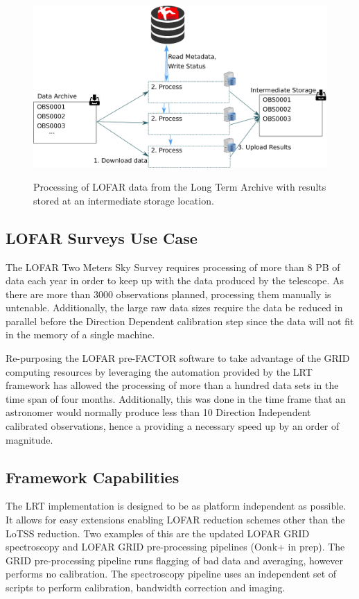 \begin{figure}
 \includegraphics[width=.76\textwidth]{ch3/figures/token_process.eps}\\
    \caption[Schematic of data movement.]{Processing of LOFAR data from the Long Term Archive with results stored at an intermediate storage location.}
 \label{fig:ch3_tok_process}
\end{figure}

\subsection{LOFAR Surveys Use Case}\label{sec:ch3_use}
The LOFAR Two Meters Sky Survey requires processing of more than 8 PB of data each year in order to keep up with the data produced by the telescope. As there are more than 3000 observations planned, processing them manually is untenable. Additionally, the large raw data sizes require the data be reduced in parallel before the Direction Dependent calibration step since the data will not fit in the memory of a single machine. 

Re-purposing the LOFAR pre-FACTOR software to take advantage of the GRID computing resources by leveraging the automation provided by the LRT framework has allowed the processing of more than a hundred data sets in the time span of four months. Additionally, this was done in the time frame that an astronomer would normally produce less than 10 Direction Independent calibrated observations, hence a providing a necessary speed up by an order of magnitude.


\subsection{Framework Capabilities}\label{sec:ch3_capabilities}

The LRT implementation is designed to be as platform independent as possible. It allows for easy extensions enabling LOFAR reduction schemes other than the LoTSS reduction. Two examples of this are the updated LOFAR GRID spectroscopy and LOFAR GRID pre-processing pipelines (Oonk+ in prep). The GRID pre-processing pipeline runs flagging of bad data and averaging, however performs no calibration. The spectroscopy pipeline uses an independent set of scripts to perform calibration,  bandwidth correction and imaging. 

